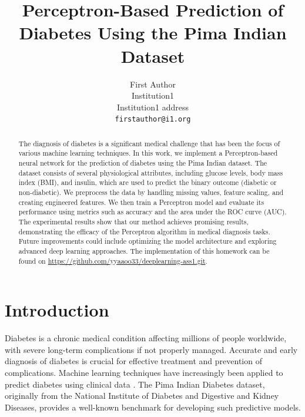 \documentclass[10pt,twocolumn,letterpaper]{article}
\begin{document}
\title{Perceptron-Based Prediction of Diabetes Using the Pima Indian Dataset}
\author{
First Author\\
Institution1\\
Institution1 address\\
{\tt\small firstauthor@i1.org}
}


\maketitle

\begin{abstract}
The diagnosis of diabetes is a significant medical challenge that has been the focus of various machine learning techniques. In this work, we implement a Perceptron-based neural network for the prediction of diabetes using the Pima Indian dataset. The dataset consists of several physiological attributes, including glucose levels, body mass index (BMI), and insulin, which are used to predict the binary outcome (diabetic or non-diabetic). We preprocess the data by handling missing values, feature scaling, and creating engineered features. We then train a Perceptron model and evaluate its performance using metrics such as accuracy and the area under the ROC curve (AUC). The experimental results show that our method achieves promising results, demonstrating the efficacy of the Perceptron algorithm in medical diagnosis tasks. Future improvements could include optimizing the model architecture and exploring advanced deep learning approaches. The implementation of this homework can be found on \url{https://github.com/yyaaoo33/deeplearning-ass1.git}.
\end{abstract}

\section{Introduction}
Diabetes is a chronic medical condition affecting millions of people worldwide, with severe long-term complications if not properly managed. Accurate and early diagnosis of diabetes is crucial for effective treatment and prevention of complications. Machine learning techniques have increasingly been applied to predict diabetes using clinical data \cite{soni2020diabetes}. The Pima Indian Diabetes dataset, originally from the National Institute of Diabetes and Digestive and Kidney Diseases, provides a well-known benchmark for developing such predictive models.
\end{document}
